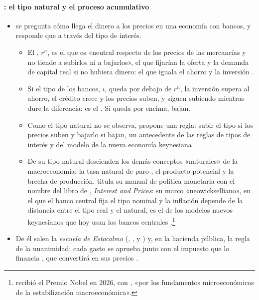 \documentclass[11pt]{article}
\begin{document}
\paragraph{: el tipo natural y el proceso acumulativo}

\begin{itemize}
\item {} se pregunta cómo llega el dinero a los precios en una economía con bancos, y responde que a través del tipo de interés\nocite{Wicksell1898Geldzins}.
  \begin{itemize}
  \item El , $r^n$, es el que es «neutral respecto de los precios de las mercancías y no tiende a subirlos ni a bajarlos», el que fijarían la oferta y la demanda de capital real si no hubiera dinero\nocite{Wicksell1936Interest}: el que iguala el ahorro y la inversión .
  \item Si el tipo de los bancos, $i$, queda por debajo de $r^n$, la inversión supera al ahorro, el crédito crece y los precios suben, y siguen subiendo mientras dure la diferencia: es el . Si queda por encima, bajan.
  \item Como el tipo natural no se observa, propone una regla: subir el tipo si los precios suben y bajarlo si bajan, un antecedente de las reglas de tipos de interés  y del modelo de la nueva economía keynesiana .
  \item De su tipo natural descienden los demás conceptos «naturales» de la macroeconomía: la tasa natural de paro , el producto potencial y la brecha de producción. \textcite{Woodford2003Interest} titula su manual de política monetaria con el nombre del libro de , \emph{Interest and Prices}: su marco «neowickselliano», en el que el banco central fija el tipo nominal y la inflación depende de la distancia entre el tipo real y el natural, es el de los modelos nuevos keynesianos que hoy usan los bancos centrales .\footnote{ recibió el Premio Nobel en 2026, con , «por los fundamentos microeconómicos de la estabilización macroeconómica»\nocite{Nobel2026Prensa}.}
  \end{itemize}
\item De él salen la \emph{escuela de Estocolmo} (, ,  y ) y, en la hacienda pública, la regla de la unanimidad: cada gasto se aprueba junto con el impuesto que lo financia\nocite{Wicksell1896Finanztheoretische} , que \textcite{Lindahl1919Gerechtigkeit} convertirá en sus precios .
\end{itemize}
\end{document}
